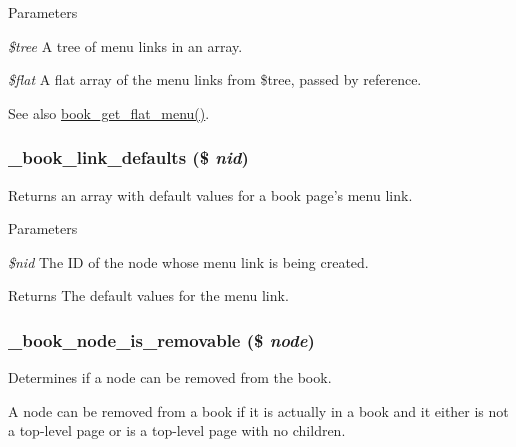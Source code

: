 \begin{DoxyParams}{Parameters}
\item[{\em \$tree}]A tree of menu links in an array. \item[{\em \$flat}]A flat array of the menu links from \$tree, passed by reference.\end{DoxyParams}
\begin{DoxySeeAlso}{See also}
\hyperlink{book_8module_acf95f70abbeb522883dc96c8ccd9dd4d}{book\_\-get\_\-flat\_\-menu()}. 
\end{DoxySeeAlso}
\hypertarget{book_8module_acbbb591a09116e8fc049489d66778474}{
\subsubsection[{\_\-book\_\-link\_\-defaults}]{\setlength{\rightskip}{0pt plus 5cm}\_\-book\_\-link\_\-defaults (\$ {\em nid})}}
\label{book_8module_acbbb591a09116e8fc049489d66778474}
Returns an array with default values for a book page's menu link.


\begin{DoxyParams}{Parameters}
\item[{\em \$nid}]The ID of the node whose menu link is being created.\end{DoxyParams}
\begin{DoxyReturn}{Returns}
The default values for the menu link. 
\end{DoxyReturn}
\hypertarget{book_8module_ad1358d4e9c13cd0a43dd941728b47892}{
\subsubsection[{\_\-book\_\-node\_\-is\_\-removable}]{\setlength{\rightskip}{0pt plus 5cm}\_\-book\_\-node\_\-is\_\-removable (\$ {\em node})}}
\label{book_8module_ad1358d4e9c13cd0a43dd941728b47892}
Determines if a node can be removed from the book.

A node can be removed from a book if it is actually in a book and it either is not a top-\/level page or is a top-\/level page with no children.


